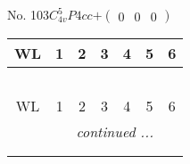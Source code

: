 \documentclass[fleqn,9pt,landscape]{jsarticle}
\begin{document}
\newpage
No. 103\quad$C_{4v}^{5}$\quad$P4cc$\quad[ tetragonal ]\quad$+\begin{pmatrix} 0 & 0 & 0 \end{pmatrix}$
\begin{center}
\renewcommand{\arraystretch}{1.2}
\begin{longtable}{ccccccc}
 \hline \hline
WL & 1 & 2 & 3 & 4 & 5 & 6 \\ \hline \endfirsthead

\multicolumn{6}{l}{\tablename\ \thetable{}} \\
 \hline \hline
WL & 1 & 2 & 3 & 4 & 5 & 6 \\ \hline \endhead

 \hline \hline
\multicolumn{6}{r}{\footnotesize\it continued ...} \\ \endfoot

 \hline \hline
\multicolumn{6}{r}{} \\ \endlastfoot


\end{longtable}
\end{center}
\end{document}
